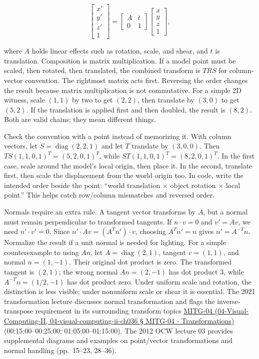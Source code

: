 \[
\begin{bmatrix}x'\\y'\\z'\\1\end{bmatrix}=
\begin{bmatrix}A&t\\0&1\end{bmatrix}
\begin{bmatrix}x\\y\\z\\1\end{bmatrix},
\]

where \(A\) holds linear effects such as rotation, scale, and shear, and \(t\) is translation. Composition is matrix multiplication. If a model point must be scaled, then rotated, then translated, the combined transform is \(TRS\) for column-vector convention. The rightmost matrix acts first. Reversing the order changes the result because matrix multiplication is not commutative. For a simple 2D witness, scale \((1,1)\) by two to get \((2,2)\), then translate by \((3,0)\) to get \((5,2)\). If the translation is applied first and then doubled, the result is \((8,2)\). Both are valid chains; they mean different things.

Check the convention with a point instead of memorizing it. With column vectors, let \(S=\operatorname{diag}(2,2,1)\) and let \(T\) translate by \((3,0,0)\). Then \(TS(1,1,0,1)^T=(5,2,0,1)^T\), while \(ST(1,1,0,1)^T=(8,2,0,1)^T\). In the first case, scale around the model's local origin, then place it. In the second, translate first, then scale the displacement from the world origin too. In code, write the intended order beside the point: ``world translation × object rotation × local point.'' This helps catch row/column mismatches and reversed order.

Normals require an extra rule. A tangent vector transforms by \(A\), but a normal must remain perpendicular to transformed tangents. If \(n\cdot v=0\) and \(v'=Av\), we need \(n'\cdot v'=0\). Since \(n'\cdot Av=(A^Tn')\cdot v\), choosing \(A^Tn'=n\) gives \(n'=A^{-T}n\). Normalize the result if a unit normal is needed for lighting. For a simple counterexample to using \(An\), let \(A=\operatorname{diag}(2,1)\), tangent \(v=(1,1)\), and normal \(n=(1,-1)\). Their original dot product is zero. The transformed tangent is \((2,1)\); the wrong normal \(An=(2,-1)\) has dot product \(3\), while \(A^{-T}n=(1/2,-1)\) has dot product zero. Under uniform scale and rotation, the distinction is less visible; under nonuniform scale or shear it is essential. The 2021 transformation lecture discusses normal transformation and flags the inverse-transpose requirement in its surrounding transform topics \href{}{MITG-04 (04-Visual-Computing-II, 04-visual-computing-ii-ch036 § MITG-04 - Transformations)} (00:15:00--00:25:00; 01:05:00--01:15:00). The 2012 OCW lecture 03 provides supplemental diagrams and examples on point/vector transformations and normal handling (pp.~15--23, 28--36).


